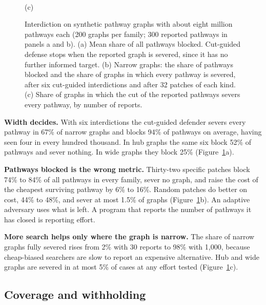 \documentclass[10pt,twocolumn,letterpaper]{article}
\theoremstyle{definition}
\newcommand{\para}[1]{\smallskip\noindent\textbf{#1}\enspace}
\newcommand{\CutSeverNarrowSix}{67}
\newcommand{\CutBlockNarrowSix}{94}
\newcommand{\CutBlockHubSix}{52}
\newcommand{\CutBlockWideSix}{25}
\newcommand{\PatchSpecBlockNarrow}{74}
\newcommand{\PatchSpecGainNarrow}{6}
\newcommand{\PatchRandGainNarrow}{48}
\newcommand{\PatchSpecBlockHub}{84}
\newcommand{\PatchSpecGainHub}{16}
\newcommand{\PatchRandGainWide}{44}
\newcommand{\PatchRandSeverNarrow}{1.5}
\newcommand{\SeverNThirty}{2}
\newcommand{\SeverNThousand}{98}
\newcommand{\SeverWideMax}{5}
\begin{document}
\begin{figure}[t]
\begin{minipage}[t]{0.335\textwidth}
\\[-2pt]
{\scriptsize (c)}
\end{minipage}
\caption{Interdiction on synthetic pathway graphs with about eight million pathways each (200 graphs per family; 300 reported pathways in panels a and b). (a) Mean share of all pathways blocked. Cut-guided defense stops when the reported graph is severed, since it has no further informed target. (b) Narrow graphs: the share of pathways blocked and the share of graphs in which every pathway is severed, after six cut-guided interdictions and after 32 patches of each kind. (c) Share of graphs in which the cut of the reported pathways severs every pathway, by number of reports.}
\label{fig:interdiction}
\end{figure}

\para{Width decides.} With six interdictions the cut-guided defender severs every pathway in \CutSeverNarrowSix\% of narrow graphs and blocks \CutBlockNarrowSix\% of pathways on average, having seen four in every hundred thousand. In hub graphs the same six block \CutBlockHubSix\% of pathways and sever nothing. In wide graphs they block \CutBlockWideSix\% (Figure~\ref{fig:interdiction}a).

\para{Pathways blocked is the wrong metric.} Thirty-two specific patches block \PatchSpecBlockNarrow\% to \PatchSpecBlockHub\% of all pathways in every family, sever no graph, and raise the cost of the cheapest surviving pathway by \PatchSpecGainNarrow\% to \PatchSpecGainHub\%. Random patches do better on cost, \PatchRandGainWide\% to \PatchRandGainNarrow\%, and sever at most \PatchRandSeverNarrow\% of graphs (Figure~\ref{fig:interdiction}b). An adaptive adversary uses what is left. A program that reports the number of pathways it has closed is reporting effort.

\para{More search helps only where the graph is narrow.} The share of narrow graphs fully severed rises from \SeverNThirty\% with 30 reports to \SeverNThousand\% with 1,000, because cheap-biased searchers are slow to report an expensive alternative. Hub and wide graphs are severed in at most \SeverWideMax\% of cases at any effort tested (Figure~\ref{fig:interdiction}c).

\subsection{Coverage and withholding}
\end{document}
